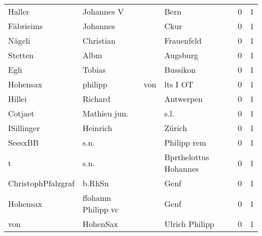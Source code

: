 \begin{center}
\begin{tiny}
\begin{longtabu}{llllrr}
                   Haller &                         Johannes V &             &                                        Bern &          0 &         1 \\
                Fäbrieims &                           Johannes &             &                                        Ckur &          0 &         1 \\
                   Nägeli &                          Christian &             &                                  Frauenfeld &          0 &         1 \\
                  Stetten &                               Albm &             &                                    Augsburg &          0 &         1 \\
                     Egli &                             Tobias &             &                                    Bussikon &          0 &         1 \\
                 Hohensax &                            philipp &         von &                                    lts I OT &          0 &         1 \\
                   Hillei &                            Richard &             &                                   Antwerpen &          0 &         1 \\
                  Cotjaet &                       Mathieu jun. &             &                                        s.l. &          0 &         1 \\
               ISillinger &                           Heinrich &             &                                      Zürich &          0 &         1 \\
                  SeesxBB &                               s.n. &             &                                 Philipp rem &          0 &         1 \\
                        t &                               s.n. &             &                       Bprthelottus Hohannes &          0 &         1 \\
       ChristophPfalzgraf &                             b.RhSn &             &                                        Genf &          0 &         1 \\
                 Hohensax &                 ffohamn Philipp vc &             &                                        Genf &          0 &         1 \\
                      von &                           HohenSax &             &                              Ulrich Philipp &          0 &         1 \\

\end{longtabu}
\end{tiny}
\end{center}
